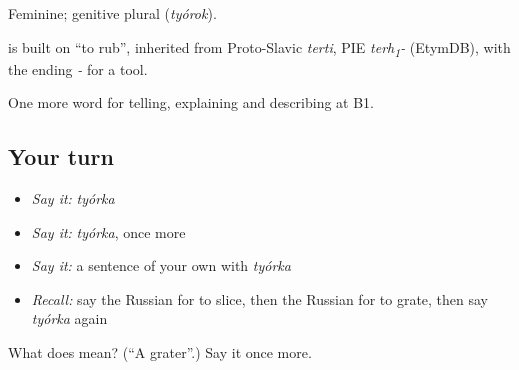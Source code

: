 Feminine; genitive plural \emph{} (\emph{tyórok}).

\begin{cousinweb}
\emph{} is built on \emph{} \textquotedblleft{}to rub\textquotedblright{}, inherited from Proto-Slavic \emph{terti}, PIE \emph{terh\textsubscript{1}-} (EtymDB), with the ending \emph{-} for a tool.
\end{cousinweb}

\begin{grammarlens}[title={What you've built}]
One more word for telling, explaining and describing at B1.
\end{grammarlens}

\subsection*{Your turn}
\begin{itemize}
\raggedright
  \item \emph{Say it:} \emph{tyórka}
  \item \emph{Say it:} \emph{tyórka}, once more
  \item \emph{Say it:} a sentence of your own with \emph{tyórka}
  \item \emph{Recall:} say the Russian for to slice, then the Russian for to grate, then say \emph{tyórka} again
\end{itemize}

\begin{tcolorbox}[breakable,colback=teal!4,colframe=teal!35!black,title={Before you move on}]
What does  mean? (\textquotedblleft{}A grater\textquotedblright{}.) Say it once more.
\end{tcolorbox}
